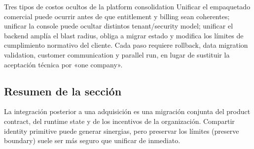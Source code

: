 
\begin{warningbox}{Tres tipos de costos ocultos de la platform consolidation}
Unificar el empaquetado comercial puede ocurrir antes de que entitlement y billing sean coherentes; unificar la console puede ocultar distintos tenant/security model; unificar el backend amplía el blast radius, obliga a migrar estado y modifica los límites de cumplimiento normativo del cliente. Cada paso requiere rollback, data migration validation, customer communication y parallel run, en lugar de sustituir la aceptación técnica por «one company».
\end{warningbox}

\subsection{Resumen de la sección}

La integración posterior a una adquisición es una migración conjunta del product contract, del runtime state y de los incentivos de la organización. Compartir identity primitive puede generar sinergias, pero preservar los límites (preserve boundary) suele ser más seguro que unificar de inmediato.

